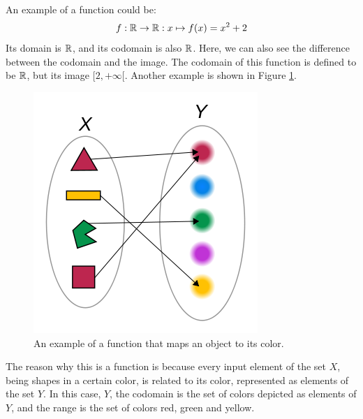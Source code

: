         An example of a function could be:
        \begin{equation}
            f: \mathbb{R} \rightarrow \mathbb{R}: x \mapsto f(x) = x^2 + 2
        \end{equation}
        Its domain is $\mathbb{R}$, and its codomain is also $\mathbb{R}$. Here, we can also see the difference between the codomain and the image. The codomain of this function is defined to be $\mathbb{R}$, but its image $[2, +\infty[$. Another example is shown in Figure \ref{fig:function_color}.
        \begin{figure}[H] \centering
            \includegraphics[scale=0.4]{images/function_color}
            \caption{An example of a function that maps an object to its color.}
            \label{fig:function_color}
        \end{figure}
        The reason why this is a function is because every input element of the set $X$, being shapes in a certain color, is related to its color, represented as elements of the set $Y$. In this case, $Y$, the codomain is the set of colors depicted as elements of $Y$, and the range is the set of colors red, green and yellow. \\


